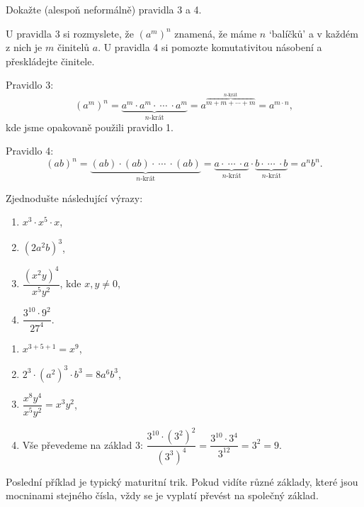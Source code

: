 \begin{problem}\label{pr:mocniny-mocnina}
  Dokažte (alespoň neformálně) pravidla 3 a 4.
\end{problem}

\begin{hint}
  U pravidla 3 si rozmyslete, že ${(a^m)}^n$ znamená, že máme $n$ `balíčků' a v každém z nich je $m$ činitelů $a$. U pravidla 4 si pomozte komutativitou násobení a přeskládejte činitele.
\end{hint}

\begin{solution}
  Pravidlo 3:
  \begin{equation*}
    {(a^m)}^n = \underbrace{a^m\cdot a^m\cdot\ \cdots\ \cdot a^m}_{n\text{-krát}} = a^{\overbrace{m + m + \cdots + m}^{n\text{-krát}}} = a^{m\cdot n},
  \end{equation*}
  kde jsme opakovaně použili pravidlo 1.

  Pravidlo 4:
  \begin{equation*}
    {(ab)}^n = \underbrace{(ab)\cdot(ab)\cdot\ \cdots\ \cdot(ab)}_{n\text{-krát}} = \underbrace{a\cdot\ \cdots\ \cdot a}_{n\text{-krát}}\cdot\underbrace{b\cdot\ \cdots\ \cdot b}_{n\text{-krát}} = a^n b^n.
  \end{equation*}
\end{solution}

\begin{problem}
  Zjednodušte následující výrazy:
  \begin{enumerate}[label=(\alph*)]
    \item $x^3\cdot x^5\cdot x$,
    \item ${(2a^2b)}^3$,
    \item $\dfrac{{(x^2y)}^4}{x^5y^2}$, kde $x, y\neq 0$,
    \item $\dfrac{3^{10}\cdot 9^2}{27^4}$.
  \end{enumerate}
\end{problem}

\begin{solution}
  \begin{enumerate}[label=(\alph*)]
    \item $x^{3+5+1} = x^9$,
    \item $2^3\cdot{(a^2)}^3\cdot b^3 = 8a^6b^3$,
    \item $\dfrac{x^8y^4}{x^5y^2} = x^3y^2$,
    \item Vše převedeme na základ $3$: $\dfrac{3^{10}\cdot{(3^2)}^2}{{(3^3)}^4} = \dfrac{3^{10}\cdot 3^4}{3^{12}} = 3^{2} = 9$.
  \end{enumerate}
  Poslední příklad je typický maturitní trik. Pokud vidíte různé základy, které jsou mocninami stejného čísla, vždy se je vyplatí převést na společný základ.
\end{solution}


